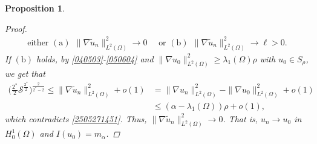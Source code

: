 \documentclass[10pt,a4paper]{amsart}
\newtheorem{proposition}{Proposition}
\begin{document}
\begin{proposition}
\begin{proof}
\begin{equation*}
\begin{aligned}
\text{either }\mathrm{(a)}~~\|\nabla \tilde{u}_n\|^{2}_{L^{2}(\Omega)}\rightarrow 0 \quad
\text{ or } \mathrm{(b)}~~\|\nabla \tilde{u}_n\|^{2}_{L^{2}(\Omega)}\rightarrow \ell>0.
\end{aligned}
\end{equation*}
If $\mathrm{(b)}$ holds,
by \eqref{040503}-\eqref{050604} and $\|\nabla u_0\|^{2}_{L^{2}(\Omega)}\geq\lambda_{1}(\Omega)\rho$ with $u_0\in S_{\rho}$, we get that
\begin{equation*}
\begin{aligned}
\Big(\frac{2^{*}}{2}\mathcal{S}^{\frac{2^{*}}{2}}\Big)^{\frac{2}{2^{*}-2}}
\leq\|\nabla \tilde{u}_n\|^{2}_{L^{2}(\Omega)}+o(1)
&=\|\nabla u_n\|^{2}_{L^{2}(\Omega)}
-\|\nabla u_0\|^{2}_{L^{2}(\Omega)}+o(1)\\
&\leq(\alpha-\lambda_{1}(\Omega))\rho+o(1),
\end{aligned}
\end{equation*}
which contradicts \eqref{2505271451}. Thus, $\|\nabla \tilde{u}_n\|^{2}_{L^{2}(\Omega)}\rightarrow 0$. That is, $u_n\rightarrow u_0$ in $H^1_0(\Omega)$ and $I(u_0)=m_{\alpha}$.
\end{proof}
\end{proposition}
\end{document}
